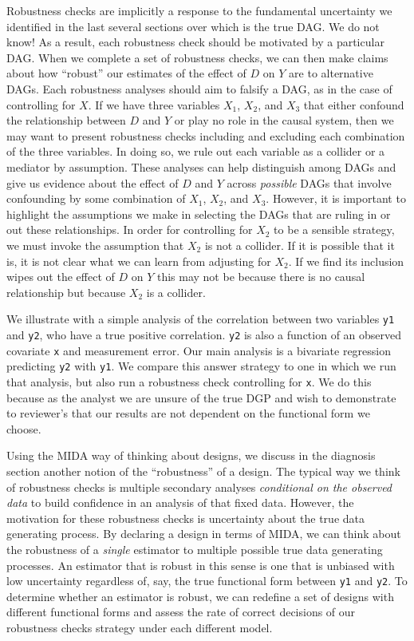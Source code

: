 \documentclass[
]{article}
\begin{document}
Robustness checks are implicitly a response to the fundamental
uncertainty we identified in the last several sections over which is the
true DAG. We do not know! As a result, each robustness check should be
motivated by a particular DAG. When we complete a set of robustness
checks, we can then make claims about how ``robust'' our estimates of
the effect of \(D\) on \(Y\) are to alternative DAGs. Each robustness
analyses should aim to falsify a DAG, as in the case of controlling for
\(X\). If we have three variables \(X_1\), \(X_2\), and \(X_3\) that
either confound the relationship between \(D\) and \(Y\) or play no role
in the causal system, then we may want to present robustness checks
including and excluding each combination of the three variables. In
doing so, we rule out each variable as a collider or a mediator by
assumption. These analyses can help distinguish among DAGs and give us
evidence about the effect of \(D\) and \(Y\) across \emph{possible} DAGs
that involve confounding by some combination of \(X_1\), \(X_2\), and
\(X_3\). However, it is important to highlight the assumptions we make
in selecting the DAGs that are ruling in or out these relationships. In
order for controlling for \(X_2\) to be a sensible strategy, we must
invoke the assumption that \(X_2\) is not a collider. If it is possible
that it is, it is not clear what we can learn from adjusting for
\(X_2\). If we find its inclusion wipes out the effect of \(D\) on \(Y\)
this may not be because there is no causal relationship but because
\(X_2\) is a collider.

We illustrate with a simple analysis of the correlation between two
variables \texttt{y1} and \texttt{y2}, who have a true positive
correlation. \texttt{y2} is also a function of an observed covariate
\texttt{x} and measurement error. Our main analysis is a bivariate
regression predicting \texttt{y2} with \texttt{y1}. We compare this
answer strategy to one in which we run that analysis, but also run a
robustness check controlling for \texttt{x}. We do this because as the
analyst we are unsure of the true DGP and wish to demonstrate to
reviewer's that our results are not dependent on the functional form we
choose.

Using the MIDA way of thinking about designs, we discuss in the
diagnosis section another notion of the ``robustness'' of a design. The
typical way we think of robustness checks is multiple secondary analyses
\emph{conditional on the observed data} to build confidence in an
analysis of that fixed data. However, the motivation for these
robustness checks is uncertainty about the true data generating process.
By declaring a design in terms of MIDA, we can think about the
robustness of a \emph{single} estimator to multiple possible true data
generating processes. An estimator that is robust in this sense is one
that is unbiased with low uncertainty regardless of, say, the true
functional form between \texttt{y1} and \texttt{y2}. To determine
whether an estimator is robust, we can redefine a set of designs with
different functional forms and assess the rate of correct decisions of
our robustness checks strategy under each different model.
\end{document}
